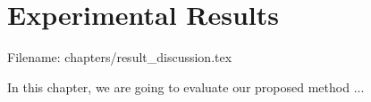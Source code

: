 \chapter{Experimental Results}\label{ch:experimental_result}
Filename: chapters/result\_discussion.tex

In this chapter, we are going to evaluate our proposed method ...